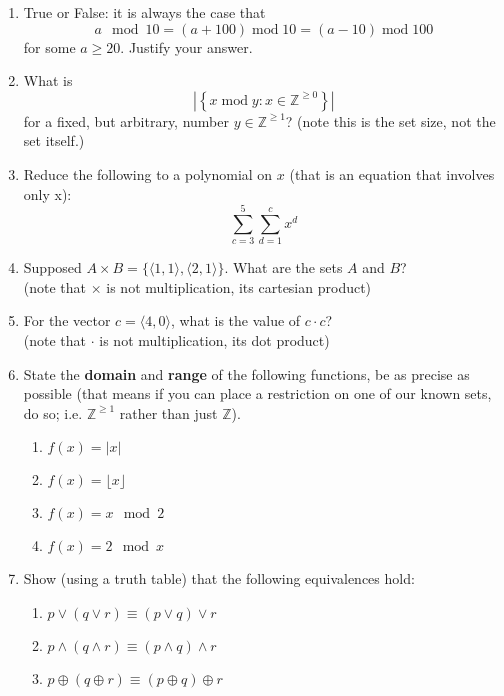 \documentclass[11pt, oneside]{article}   	%
\DeclareMathOperator{\plainmod}{\text{ mod }}
\newcommand{\ints}{\mathbb{Z}}
\begin{document}
\begin{enumerate}

\item True or False: it is always the case that
\[
a\mod 10 = (a+100)\plainmod 10 = (a-10)\plainmod 100
\]
for some $a\ge 20$. Justify your answer. 

\item What is 
\[
\left|\left\{x\plainmod y : x \in \ints^{\ge 0}\right\}\right|
\]
for a fixed, but arbitrary, number $y\in\ints^{\ge1}$? 
(note this is the set size, not the set itself.)

\item Reduce the following to a polynomial on $x$ (that is an equation that involves only x):
\[
\sum_{c=3}^5 \sum_{d=1}^c x^d
\]

\item Supposed $A\times B = \{\langle1,1\rangle, \langle2,1\rangle\}$. What are the sets $A$ and $B$? \\(note that $\times$ is not multiplication, its cartesian product)

\item For the vector $c=\langle 4 , 0 \rangle$, what is the value of $c\cdot c$? \\(note that $\cdot$ is not multiplication, its dot product)

\item State the \textbf{domain} and \textbf{range} of the following functions, be as precise as possible (that means if you can place a restriction on one of our known sets, do so; i.e. $\mathbb{Z}^{\ge1}$ rather than just $\mathbb{Z}$).
\begin{enumerate}
\item $f(x) = |x|$
\item $f(x) = \lfloor x \rfloor$
\item $f(x) = x \mod 2$
\item $f(x) = 2 \mod x$
\end{enumerate}

\item Show (using a truth table) that the following equivalences hold: 
\begin{enumerate}
\item $p \vee (q \vee r) \equiv (p \vee q) \vee r$
\item $p \wedge (q \wedge r) \equiv (p \wedge q) \wedge r$
\item $p \oplus (q \oplus r) \equiv (p \oplus q) \oplus r$
\end{enumerate}
\end{enumerate}
\end{document}
